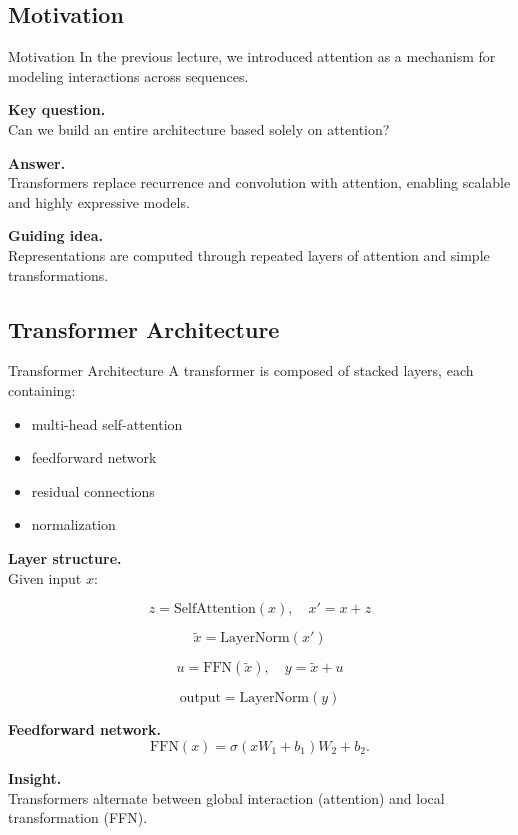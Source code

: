 \documentclass[aspectratio=169,11pt]{beamer}
\begin{document}
\subsection{Motivation}
\begin{frame}[t,allowframebreaks]{Motivation}
\small
In the previous lecture, we introduced attention as a mechanism for modeling interactions across sequences.

\textbf{Key question.}\\ Can we build an entire architecture based solely on attention?

\textbf{Answer.}\\ Transformers replace recurrence and convolution with attention, enabling scalable and highly expressive models.

\textbf{Guiding idea.}\\ Representations are computed through repeated layers of attention and simple transformations.
\end{frame}

\subsection{Transformer Architecture}
\begin{frame}[t,allowframebreaks]{Transformer Architecture}
\small
A transformer is composed of stacked layers, each containing:

\begin{itemize}
    \item multi-head self-attention
    \item feedforward network
    \item residual connections
    \item normalization
\end{itemize}

\textbf{Layer structure.}\\ Given input $x$:

\[
z = \text{SelfAttention}(x),
\quad
x' = x + z
\]

\[
\tilde{x} = \text{LayerNorm}(x')
\]

\[
u = \text{FFN}(\tilde{x}),
\quad
y = \tilde{x} + u
\]

\[
\text{output} = \text{LayerNorm}(y)
\]

\textbf{Feedforward network.}\\ \[
\text{FFN}(x) = \sigma(xW_1 + b_1) W_2 + b_2.
\]

\textbf{Insight.}\\ Transformers alternate between global interaction (attention) and local transformation (FFN).
\end{frame}
\end{document}
